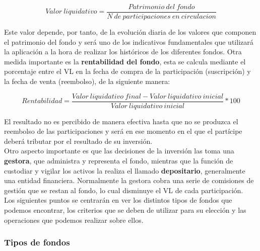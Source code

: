 \documentclass[12pt, a4paper]{article}
\begin{document}
\begin{center}
	\begin{equation}
	Valor\ liquidativo = \frac{ Patrimonio\ del\ fondo}{N\ de\ participaciones\ en\ circulacion}
	\end{equation}
	\label{valorliquidativo}
\end{center}
\vspace{1cm}

Este valor depende, por tanto, de la evolución diaria de los valores que componen el patrimonio del fondo y será uno de los indicativos fundamentales que utilizará la aplicación a la hora de realizar los históricos de los diferentes fondos. Otra medida importante es la \textbf{rentabilidad del fondo}, esta se calcula mediante el porcentaje entre el \gls{VL} en la fecha de compra de la participación (suscripción) y la fecha de venta (reembolso), de la siguiente manera:

\begin{center}
	\begin{equation}
	Rentabilidad = \frac{ Valor\ liquidativo\ final - Valor\ liquidativo\ inicial}{Valor\ liquidativo\ inicial } * 100
	\end{equation}
\end{center}

\newpage

El resultado no es percibido de manera efectiva hasta que no se produzca el reembolso de las participaciones y será en ese momento en el que el partícipe deberá tributar por el resultado de su inversión. \\


Otro aspecto importante es que las decisiones de la inversión las toma una \textbf{gestora}, que administra y representa el fondo, mientras que la función de custodiar y vigilar los activos la realiza el llamado \textbf{depositario}, generalmente una entidad financiera. Normalmente la gestora cobra una serie de comisiones de gestión que se restan al fondo, lo cual disminuye el \gls{VL} de cada participación.\\

Los siguientes puntos se centrarán en ver los distintos tipos de fondos que podemos encontrar, los criterios que se deben de utilizar para su elección y las operaciones que podemos realizar sobre ellos.


\subsubsection{Tipos de fondos }
\end{document}

